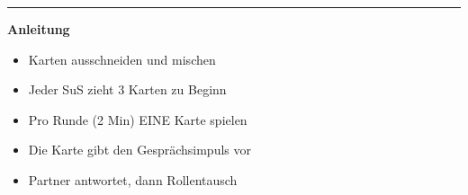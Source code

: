 \documentclass[11pt, a4paper]{article}
\begin{document}
\vspace{1cm}

\hrule
\vspace{0.5cm}

\begin{center}
{\small\color{mystery}\bfseries Anleitung}
\end{center}

\begin{itemize}
    \item Karten ausschneiden und mischen
    \item Jeder SuS zieht 3 Karten zu Beginn
    \item Pro Runde (2 Min) EINE Karte spielen
    \item Die Karte gibt den Gesprächsimpuls vor
    \item Partner antwortet, dann Rollentausch
\end{itemize}
\end{document}
